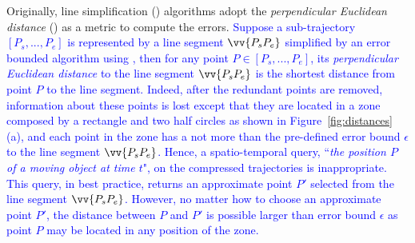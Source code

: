 Originally, line simplification (\lsa) algorithms adopt the \emph{perpendicular Euclidean distance} (\ped) as a metric to compute the errors.
\textcolor{blue}{Suppose a sub-trajectory $[P_s, ..., P_e]$ is represented by a line segment $\vv{P_sP_e}$  simplified by an error bounded \lsa algorithm using \ped, then for any point $P \in [P_s, ..., P_e]$, its \emph{perpendicular Euclidean distance} to the line segment $\vv{P_sP_e}$  is the shortest distance from point $P$ to the line segment.}
\textcolor{blue}{Indeed, after the redundant points are removed, information about these points is lost except that they are located in a zone composed by a rectangle and two half circles  as shown in Figure~\ref{fig:distances}(a), and each point in the zone has a \ped not more than the pre-defined error bound $\epsilon$ to the line segment $\vv{P_sP_e}$.}
\textcolor{blue}{Hence, a spatio-temporal query, \eg ``\emph{the position $P$ of a moving object at time $t$}", on the compressed trajectories is inappropriate. This query, in best practice, returns an approximate point $P'$ selected from the line segment $\vv{P_sP_e}$. However, no matter how to choose an approximate point $P'$, the distance between $P$ and $P'$ is possible larger than error bound $\epsilon$ as point $P$ may be located in any position of the zone. }





